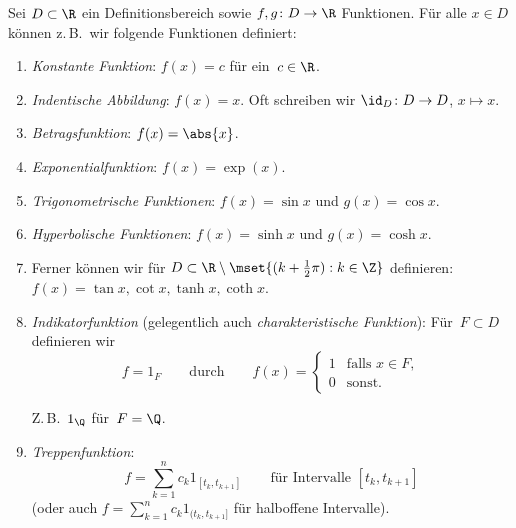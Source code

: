 \documentclass[a4paper]{article}
\begin{document}
\begin{example}
    Sei $D \subset \R$ ein Definitionsbereich sowie $f,g\colon D \to \R$ Funktionen. Für alle $x \in D$ können z.\,B.\ wir folgende Funktionen definiert:
    \begin{enumerate}
        \item \emph{Konstante Funktion}: $f(x) = c$ für ein~$c \in \R$.
        \item \emph{Indentische Abbildung}: $f(x) = x$. Oft schreiben wir $\id_D\colon D \to D$, $x \mapsto x$.
        \item \emph{Betragsfunktion}: $f(x) = \abs{x}$.
        \item \emph{Exponentialfunktion}: $f(x) = \exp(x)$.
        \item \emph{Trigonometrische Funktionen}: $f(x) = \sin x$ und $g(x) = \cos x$.
        \item \emph{Hyperbolische Funktionen}: $f(x) = \sinh x$ und $g(x) = \cosh x$.
        \item Ferner können wir für $D \subset \R \setminus \mset{(k+\frac{1}{2}\pi) : k \in \Z}$ definieren: $f(x) = \tan x, \cot x, \tanh x, \coth x$.
        \item \emph{Indikatorfunktion} (gelegentlich auch \emph{charakteristische Funktion}): Für~$F \subset D$ definieren wir
        \begin{equation*}
            f = 1_F \qquad\text{durch}\qquad f(x) =
            \begin{cases}
                1 & \text{falls } x \in F, \\
                0 & \text{sonst}.
            \end{cases}
        \end{equation*}
        \begin{center}
        \end{center}
        Z.\,B.~$1_\Q$ für~$F = \Q$.
        \item \emph{Treppenfunktion}:
        \begin{equation*}
            f = \sum_{k=1}^n c_k 1_{[t_k,t_{k+1}]} \qquad\text{für Intervalle } [t_k,t_{k+1}]
        \end{equation*}
        (oder auch $f = \sum_{k=1}^n c_k 1_{(t_k,t_{k+1}]}$ für halboffene Intervalle).
        \begin{center}
\end{center}
\end{enumerate}
\end{example}
\end{document}

